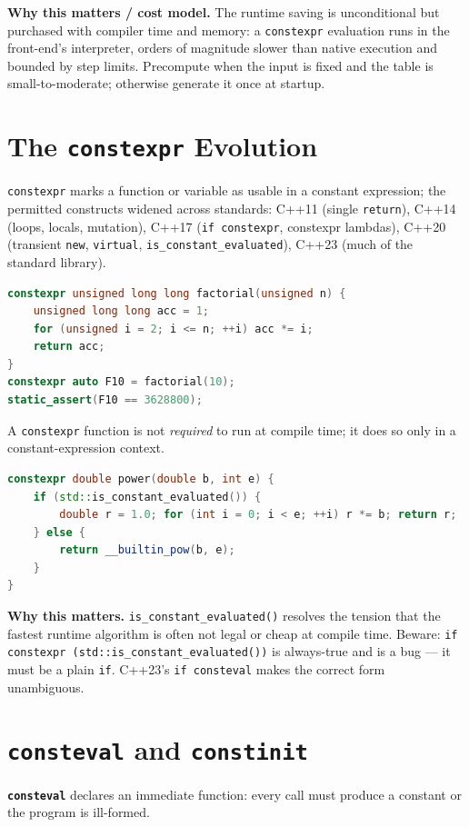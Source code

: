 \textbf{Why this matters / cost model.} The runtime saving is unconditional but purchased with compiler time and memory: a \texttt{constexpr} evaluation runs in the front-end's interpreter, orders of magnitude slower than native execution and bounded by step limits. Precompute when the input is fixed and the table is small-to-moderate; otherwise generate it once at startup.

\section{The \texttt{constexpr} Evolution}
\texttt{constexpr} marks a function or variable as usable in a constant expression; the permitted constructs widened across standards: C++11 (single \texttt{return}), C++14 (loops, locals, mutation), C++17 (\texttt{if constexpr}, constexpr lambdas), C++20 (transient \texttt{new}, \texttt{virtual}, \texttt{is\_constant\_evaluated}), C++23 (much of the standard library).

\begin{lstlisting}[language=C++, caption={A C++14-style imperative constexpr function. Min standard: C++14.}]
constexpr unsigned long long factorial(unsigned n) {
    unsigned long long acc = 1;
    for (unsigned i = 2; i <= n; ++i) acc *= i;
    return acc;
}
constexpr auto F10 = factorial(10);
static_assert(F10 == 3628800);
\end{lstlisting}

A \texttt{constexpr} function is not \emph{required} to run at compile time; it does so only in a constant-expression context.

\begin{lstlisting}[language=C++, caption={Dual-mode evaluation. The builtin is GCC/Clang-specific (non-portable). Min standard: C++20.}]
constexpr double power(double b, int e) {
    if (std::is_constant_evaluated()) {
        double r = 1.0; for (int i = 0; i < e; ++i) r *= b; return r;
    } else {
        return __builtin_pow(b, e);
    }
}
\end{lstlisting}

\textbf{Why this matters.} \texttt{is\_constant\_evaluated()} resolves the tension that the fastest runtime algorithm is often not legal or cheap at compile time. Beware: \texttt{if constexpr (std::is\_constant\_evaluated())} is always-true and is a bug --- it must be a plain \texttt{if}. C++23's \texttt{if consteval} makes the correct form unambiguous.

\section{\texttt{consteval} and \texttt{constinit}}
\textbf{\texttt{consteval}} declares an immediate function: every call must produce a constant or the program is ill-formed.

